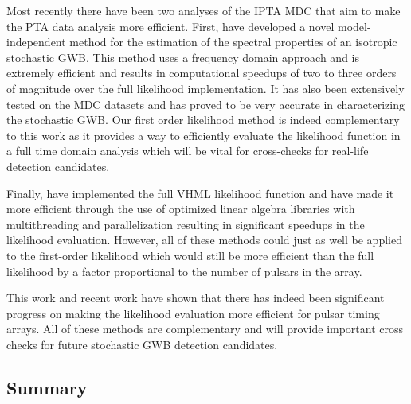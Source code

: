 \documentclass[iop]{emulateapj} \usepackage{apjfonts}
\begin{document}
Most recently there have been two analyses of the IPTA MDC that aim to
make the PTA data analysis more efficient. First,
\citet{Lentati:2012xb} have developed a novel model-independent method
for the estimation of the spectral properties of an isotropic
stochastic GWB. This method uses a frequency domain approach and is
extremely efficient and results in computational speedups of two to
three orders of magnitude over the full likelihood implementation. It
has also been extensively tested on the MDC datasets and has proved to
be very accurate in characterizing the stochastic GWB. Our first order
likelihood method is indeed complementary to this work as it provides
a way to efficiently evaluate the likelihood function in a full time
domain analysis which will be vital for cross-checks for real-life
detection candidates.

Finally, \citet{Taylor:2012vx} have implemented the full VHML
likelihood function and have made it more efficient through the use of
optimized linear algebra libraries with multithreading and
parallelization resulting in significant speedups in the likelihood
evaluation. However, all of these methods could just as well be
applied to the first-order likelihood which would still be more
efficient than the full likelihood by a factor proportional to the
number of pulsars in the array.

This work and recent work have shown that there has indeed been
significant progress on making the likelihood evaluation more
efficient for pulsar timing arrays. All of these methods are
complementary and will provide important cross checks for future
stochastic GWB detection candidates.

\subsection{Summary}
\end{document}
